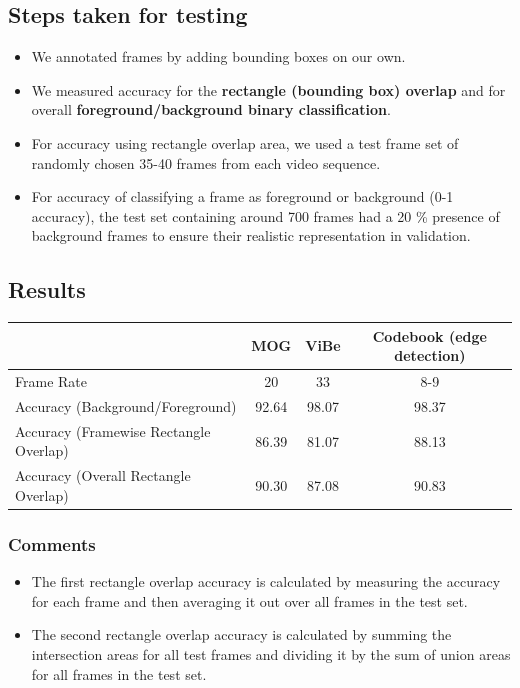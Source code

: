 \documentclass[12pt,a4paper]{article}
\begin{document}
\subsection{Steps taken for testing}
\begin{itemize}
\item We annotated frames by adding bounding boxes on our own.
\item We measured accuracy for the \textbf{rectangle (bounding box) overlap} and for overall \textbf{foreground/background binary classification}.
\item For accuracy using rectangle overlap area, we used a test frame set of randomly chosen 35-40 frames from each video sequence.
\item For accuracy of classifying a frame as foreground or background (0-1 accuracy), the test set containing around 700 frames had a 20 \% presence of background frames to ensure their realistic representation in validation.
\end{itemize}

\subsection{Results}
\begin{tabular}{| l | c | c | c |  }   
\hline
 & MOG & ViBe & Codebook (edge detection)\\
\hline \hline
Frame Rate& 20 & 33 & 8-9   \\  
\hline
Accuracy (Background/Foreground) & 92.64 & 98.07 & 98.37 \\
\hline
Accuracy (Framewise Rectangle Overlap) & 86.39 & 81.07 & 88.13  \\  
\hline
Accuracy (Overall Rectangle Overlap) & 90.30 & 87.08 & 90.83\\
\hline
\end{tabular}
\subsubsection{Comments}
\begin{itemize}
\item The first rectangle overlap accuracy is calculated by measuring the accuracy for each frame and then averaging it out over all frames in the test set.
\item The second rectangle overlap accuracy is calculated by summing the intersection areas for all test frames and dividing it by the sum of union areas for all frames in the test set.
\end{itemize}
\end{document}
